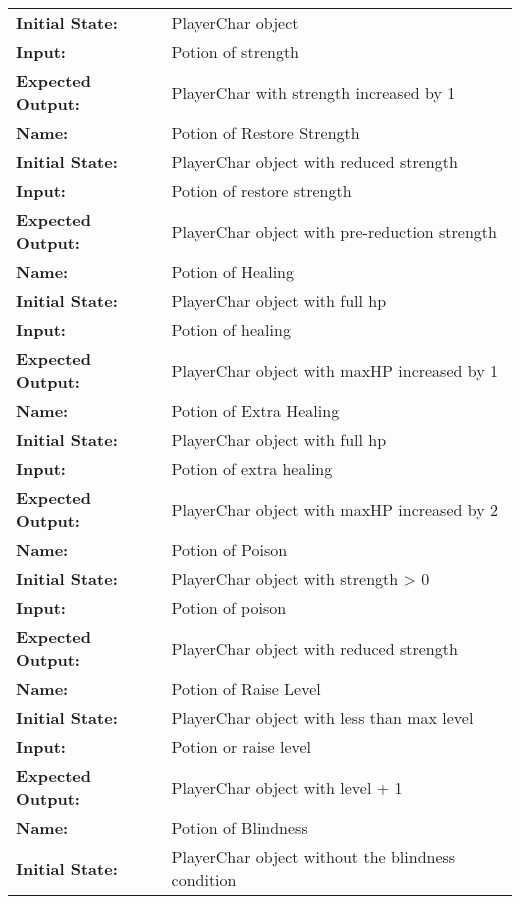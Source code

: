 \documentclass[12pt, titlepage]{article}
\begin{document}
\begin{center}
\begin{longtable}{ l | p{10cm} }
				\textbf{Initial State:} & PlayerChar object\\
				\textbf{Input:} & Potion of strength\\
				\textbf{Expected Output:} & PlayerChar with strength increased by 1\\[0.6em]
				\hline
				\rule{0pt}{1.5em}\textbf{Name:} & Potion of Restore Strength\\
				\textbf{Initial State:} & PlayerChar object with reduced strength\\
				\textbf{Input:} & Potion of restore strength\\
				\textbf{Expected Output:} & PlayerChar object with pre-reduction strength\\[0.6em]
				\hline
				\rule{0pt}{1.5em}\textbf{Name:} & Potion of Healing\\
				\textbf{Initial State:} & PlayerChar object with full hp\\
				\textbf{Input:} & Potion of healing\\
				\textbf{Expected Output:} & PlayerChar object with maxHP increased by 1\\[0.6em]
				\hline
				\rule{0pt}{1.5em}\textbf{Name:} & Potion of Extra Healing\\
				\textbf{Initial State:} & PlayerChar object with full hp\\
				\textbf{Input:} & Potion of extra healing\\
				\textbf{Expected Output:} & PlayerChar object with maxHP increased by 2\\[0.6em]
				\hline
				\rule{0pt}{1.5em}\textbf{Name:} & Potion of Poison\\
				\textbf{Initial State:} & PlayerChar object with strength > 0\\
				\textbf{Input:} & Potion of poison\\
				\textbf{Expected Output:} & PlayerChar object with reduced strength\\[0.6em]
				\hline
				\rule{0pt}{1.5em}\textbf{Name:} & Potion of Raise Level\\
				\textbf{Initial State:} & PlayerChar object with less than max level\\
				\textbf{Input:} & Potion or raise level\\
				\textbf{Expected Output:} & PlayerChar object with level + 1\\[0.6em]
				\hline
				\rule{0pt}{1.5em}\textbf{Name:} & Potion of Blindness\\
				\textbf{Initial State:} & PlayerChar object without the blindness condition\\

\end{longtable}
\end{center}
\end{document}
